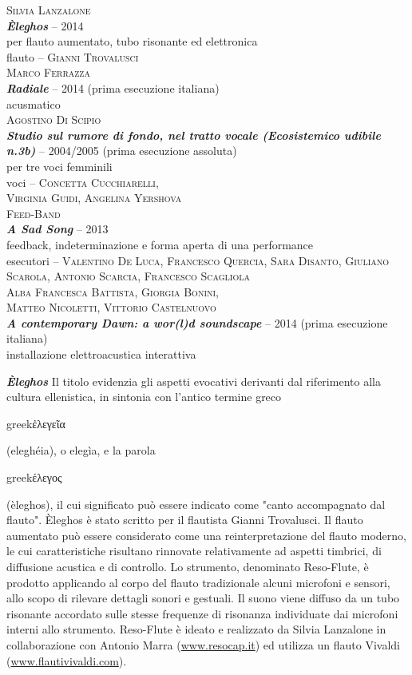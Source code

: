 \documentclass[9pt, twoside, a5paper]{extreport}
\newcommand{\greco}[1]{%
\begin{otherlanguage*}{greek}#1\end{otherlanguage*}}
\newcommand{\brano}[6]{%
\noindent \textsc{#1}\\ %
\noindent \textbf{\textit{#2}} -- #3\\%
\noindent #4\\ %
\noindent #5 -- \textsc{#6}%
\\
}%
\newcommand{\installazione}[4]{%
\noindent \textsc{#1}\\ %
\noindent \textbf{\textit{#2}} -- #3\\%
\noindent #4%
\\
}%
\newcommand{\descrizione}[2]{%
\noindent \textbf{\textit{#1}} %
#2 %
\\
}%
\begin{document}
\begin{multicols}{2}


\brano{Silvia Lanzalone}
{Èleghos}{2014}
{per flauto aumentato, tubo risonante ed elettronica}
{flauto}{Gianni Trovalusci}
 
 
\installazione{Marco Ferrazza}
{Radiale}{2014 (prima esecuzione italiana)}
{acusmatico}


\brano{Agostino Di Scipio}
{Studio sul rumore di fondo, nel tratto vocale (Ecosistemico udibile n.3b)}{2004/2005 (prima esecuzione assoluta)}
{per tre voci femminili}
{voci}{Concetta Cucchiarelli, \\Virginia Guidi, Angelina Yershova}


\brano{Feed-Band} %
{A Sad Song}{2013}
{feedback, indeterminazione e forma aperta di una performance}
{esecutori}{Valentino De Luca, Francesco Quercia, Sara Disanto, Giuliano Scarola, Antonio Scarcia, Francesco Scagliola}

\vspace{1cm}
\installazione{Alba Francesca Battista, Giorgia Bonini,\\Matteo Nicoletti, Vittorio Castelnuovo}
{A contemporary Dawn: a wor(l)d soundscape}{2014 (prima esecuzione italiana)}
{installazione elettroacustica interattiva}

\bigskip



\descrizione{Èleghos}{Il titolo evidenzia gli aspetti evocativi derivanti dal riferimento alla cultura ellenistica, in sintonia con l’antico termine greco \greco{ἐλεγεῖα} (eleghéia), o elegìa, e la parola \greco{έλεγος} (èleghos), il cui significato può essere indicato come "canto accompagnato dal flauto". Èleghos è stato scritto per il flautista Gianni Trovalusci.
Il flauto aumentato può essere considerato come una reinterpretazione del flauto moderno, le cui caratteristiche risultano rinnovate relativamente ad aspetti timbrici, di diffusione acustica e di controllo. Lo strumento, denominato Reso-Flute, è prodotto applicando al corpo del flauto tradizionale alcuni microfoni e sensori, allo scopo di rilevare dettagli sonori e gestuali. Il suono viene diffuso da un tubo risonante accordato sulle stesse frequenze di risonanza individuate dai microfoni interni allo strumento. 
Reso-Flute è ideato e realizzato da Silvia Lanzalone in collaborazione con Antonio Marra (\href{http://www.resocap.it/}{www.resocap.it}) ed utilizza un flauto Vivaldi (\href{http://www.flautivivaldi.com/}{www.flautivivaldi.com}).}


\end{multicols}
\end{document}
